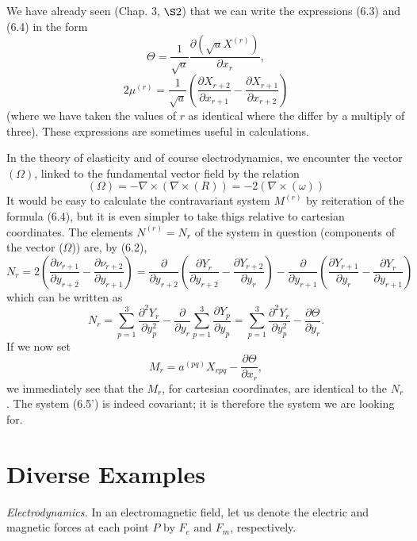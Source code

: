 \documentclass{book}
\begin{document}
We have already seen (Chap. 3, $\S2$) that we can write the expressions (6.3) and (6.4) in the form
\begin{equation*}
\tag{6.3'}
\Theta=\frac{1}{\sqrt{a}}\frac{\partial(\sqrt{a}X^{(r)})}{\partial x_r},
\end{equation*}
\begin{equation*}
\tag{6.4'}
2\mu^{(r)}=\frac{1}{\sqrt{a}}\left(\frac{\partial X_{r+2}}{\partial x_{r+1}}-\frac{\partial X_{r+1}}{\partial x_{r+2}}\right)
\end{equation*}
(where we have taken the values of $r$ as identical where the differ by a multiply of three). These expressions are sometimes useful in calculations.

In the theory of elasticity and of course electrodynamics, we encounter the vector $(\Omega)$, linked to the fundamental vector field by the relation
$$(\Omega)=-\nabla\times(\nabla\times(R))=-2(\nabla\times(\omega))$$
It would be easy to calculate the contravariant system $M^{(r)}$ by reiteration of the formula (6.4), but it is even simpler to take thigs relative to cartesian coordinates. The elements $N^{(r)}=N_r$ of the system in question (components of the vector ($\Omega$)) are, by (6.2), 
$$N_r=2\left(\frac{\partial \nu_{r+1}}{\partial y_{r+2}}-\frac{\partial \nu_{r+2}}{\partial y_{r+1}}\right)=\frac{\partial}{\partial y_{r+2}}\left(\frac{\partial Y_r}{\partial y_{r+2}}-\frac{\partial Y_{r+2}}{\partial y_r}\right)-\frac{\partial}{\partial y_{r+1}}\left(\frac{\partial Y_{r+1}}{\partial y_r}-\frac{\partial Y_r}{\partial y_{r+1}}\right)$$
which can be written as
\begin{equation}
\displaystyle N_{r}=\sum_{p=1}^3\frac{\partial^2Y_r}{\partial y_p^2}-\frac{\partial}{\partial y_r}\sum_{p=1}^3\frac{\partial Y_p}{\partial y_p}=\sum_{p=1}^3\frac{\partial^2Y_r}{\partial y_p^2}-\frac{\partial\Theta}{\partial y_r}.
\end{equation}
If we now set
\begin{equation}
M_r=a^{(pq)}X_{rpq}-\frac{\partial\Theta}{\partial x_r},
\tag{6.5'}
\end{equation}
we immediately see that the $M_r$, for cartesian coordinates, are identical to the $N_r$. The system (6.5') is indeed covariant; it is therefore the system we are looking for.

\section{Diverse Examples}
\emph{Electrodynamics.} In an electromagnetic field, let us denote the electric and magnetic forces at each point $P$ by $F_e$ and $F_m$, respectively.
\end{document}
